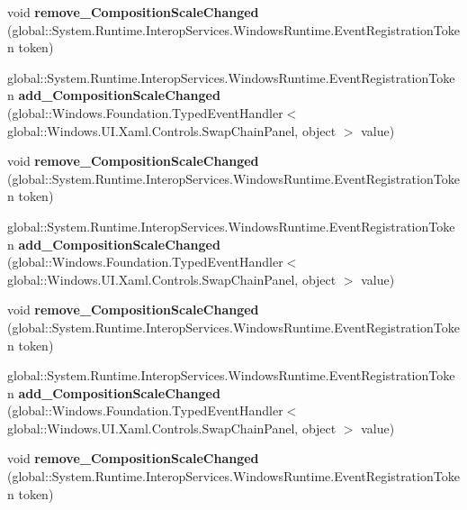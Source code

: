 \begin{DoxyCompactItemize}
void {\bfseries remove\+\_\+\+Composition\+Scale\+Changed} (global\+::\+System.\+Runtime.\+Interop\+Services.\+Windows\+Runtime.\+Event\+Registration\+Token token)
\item 
\mbox{\label{interface_windows_1_1_u_i_1_1_xaml_1_1_controls_1_1_i_swap_chain_panel_a92ad55c6177bf35978f3ebf81ef3b580}} 
global\+::\+System.\+Runtime.\+Interop\+Services.\+Windows\+Runtime.\+Event\+Registration\+Token {\bfseries add\+\_\+\+Composition\+Scale\+Changed} (global\+::\+Windows.\+Foundation.\+Typed\+Event\+Handler$<$ global\+::\+Windows.\+U\+I.\+Xaml.\+Controls.\+Swap\+Chain\+Panel, object $>$ value)
\item 
\mbox{\label{interface_windows_1_1_u_i_1_1_xaml_1_1_controls_1_1_i_swap_chain_panel_a56aa6e47b7bfd71b650a69eba4428d4e}} 
void {\bfseries remove\+\_\+\+Composition\+Scale\+Changed} (global\+::\+System.\+Runtime.\+Interop\+Services.\+Windows\+Runtime.\+Event\+Registration\+Token token)
\item 
\mbox{\label{interface_windows_1_1_u_i_1_1_xaml_1_1_controls_1_1_i_swap_chain_panel_a92ad55c6177bf35978f3ebf81ef3b580}} 
global\+::\+System.\+Runtime.\+Interop\+Services.\+Windows\+Runtime.\+Event\+Registration\+Token {\bfseries add\+\_\+\+Composition\+Scale\+Changed} (global\+::\+Windows.\+Foundation.\+Typed\+Event\+Handler$<$ global\+::\+Windows.\+U\+I.\+Xaml.\+Controls.\+Swap\+Chain\+Panel, object $>$ value)
\item 
\mbox{\label{interface_windows_1_1_u_i_1_1_xaml_1_1_controls_1_1_i_swap_chain_panel_a56aa6e47b7bfd71b650a69eba4428d4e}} 
void {\bfseries remove\+\_\+\+Composition\+Scale\+Changed} (global\+::\+System.\+Runtime.\+Interop\+Services.\+Windows\+Runtime.\+Event\+Registration\+Token token)
\item 
\mbox{\label{interface_windows_1_1_u_i_1_1_xaml_1_1_controls_1_1_i_swap_chain_panel_a92ad55c6177bf35978f3ebf81ef3b580}} 
global\+::\+System.\+Runtime.\+Interop\+Services.\+Windows\+Runtime.\+Event\+Registration\+Token {\bfseries add\+\_\+\+Composition\+Scale\+Changed} (global\+::\+Windows.\+Foundation.\+Typed\+Event\+Handler$<$ global\+::\+Windows.\+U\+I.\+Xaml.\+Controls.\+Swap\+Chain\+Panel, object $>$ value)
\item 
\mbox{\label{interface_windows_1_1_u_i_1_1_xaml_1_1_controls_1_1_i_swap_chain_panel_a56aa6e47b7bfd71b650a69eba4428d4e}} 
void {\bfseries remove\+\_\+\+Composition\+Scale\+Changed} (global\+::\+System.\+Runtime.\+Interop\+Services.\+Windows\+Runtime.\+Event\+Registration\+Token token)
\end{DoxyCompactItemize}


